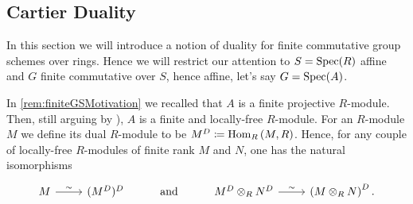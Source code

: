 \subsection{Cartier Duality}\label{CartierDualityGroups}
In this section we will introduce a notion of duality for finite commutative group schemes over rings.
Hence we will restrict our attention to $S = \operatorname{Spec}(R)$ affine
and $G$ finite commutative over $S$, hence affine, let's say $G = \operatorname{Spec}(A)$.


\begin{rem}[]
	In \cref{rem:finiteGSMotivation} we recalled that $A$ is a finite projective $R$-module.
	Then, still arguing by
	\cite[\href{https://stacks.math.columbia.edu/tag/00NX}{Lemma 00NX}]{SP}),
	$A$ is a finite and locally-free $R$-module.
	For an $R$-module $M$ we define its dual $R$-module to be
	$M^D \coloneqq \operatorname{Hom}_{R} \left( M, R \right)$.
	Hence, for any couple of locally-free $R$-modules of finite 
	rank $M$ and $N$, one has the natural isomorphisms
	\begin{equation*}%
	\begin{tikzcd}
		M \arrow[r, "\sim", rightarrow] &
		(M^D)^D &
		\text{and} &
		M^D \otimes_R N^D \arrow[r, "\sim", rightarrow] &
		\left( M \otimes_R N \right)^D
	.\end{tikzcd}
	\end{equation*}
\end{rem}


